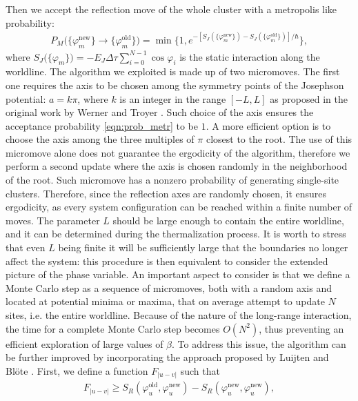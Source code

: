 \documentclass[aps,notitlepage,twocolumn,prl,nolongbibliography,superscriptaddress]{revtex4-2}
\begin{document}
Then we accept the reflection move of the whole cluster with a metropolis like probability:
\begin{equation}\label{eqn:prob_metr}\begin{split}
    P_M\bigl(\{\varphi_m^{\text{new}}\} \to \{\varphi_m^{\text{old}}\}\bigl)  = \min\biggl\{1,  e^{-[S_{J}(\{\varphi_m^{\text{new}}\})-S_{J}(\{\varphi_m^{\text{old}}\})]/\hbar} \biggr\},
    \end{split}
\end{equation}
where $S_J\bigl(\{\varphi_m\}\bigr) = -E_J\Delta\tau\sum_{i=0}^{N-1}\cos\varphi_i$ is the static interaction along the worldline. The algorithm we exploited is made up of two micromoves. The first one requires the axis to be chosen among the symmetry points of the Josephson potential: $a = k\pi$, where $k$ is an integer in the range $[-L, L]$ as proposed in the original work by Werner and Troyer \cite{Troyer_MC, Troyer_PRL}. Such choice of the axis ensures the acceptance probability \eqref{eqn:prob_metr} to be $1$. A more efficient option is to choose the axis among the three multiples of $\pi$ closest to the root. The use of this micromove alone does not guarantee the ergodicity of the algorithm, therefore we perform a second update where the axis is chosen randomly in the neighborhood of the root. Such micromove has a nonzero probability of generating single-site clusters. Therefore, since the reflection axes are randomly chosen, it ensures ergodicity, as every system configuration can be reached within a finite number of moves. The parameter $L$ should be large enough to contain the entire worldline, and it can be determined during the thermalization process. It is worth to stress that even $L$ being finite it will be sufficiently large that the boundaries no longer affect the system: this procedure is then equivalent to consider the extended picture of the phase variable. An important aspect to consider is that we define a Monte Carlo step as a sequence of micromoves, both with a random axis and located at potential minima or maxima, that on average attempt to update $N$ sites, i.e. the entire worldline. Because of the nature of the long-range interaction, the time for a complete Monte Carlo step becomes $O(N^2)$, thus preventing an efficient exploration of large values of $\beta$. To address this issue, the algorithm can be further improved by incorporating the approach proposed by Luijten and Bl\"{o}te \cite{Luijten1, Luijten2}. First, we define a function $F_{\left|u-v\right|} $ such that
\begin{equation}
    \begin{split}
        F_{\left|u-v\right|} \ge S_R(\varphi_u^{\text{old}},\varphi_u^{\text{new}}) - S_R(\varphi_u^{\text{new}},\varphi_u^{\text{new}}),
    \end{split}
\end{equation}
\end{document}
